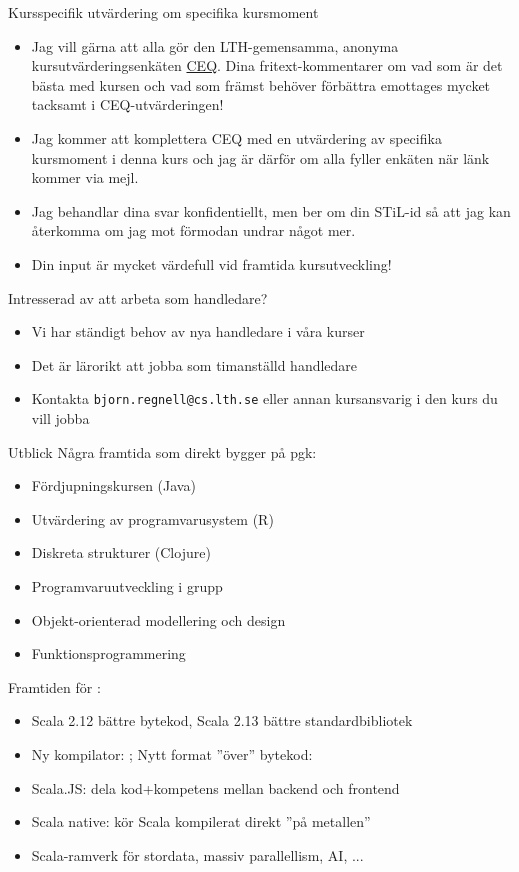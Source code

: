 \begin{Slide}{Kursspecifik utvärdering om specifika kursmoment}\SlideFontSmall
\begin{itemize}
\item Jag vill gärna att alla gör den LTH-gemensamma, anonyma kursutvärderingsenkäten \href{https://www.ceq.lth.se/}{CEQ}. Dina fritext-kommentarer om vad som är det bästa med kursen och vad som främst behöver förbättra emottages mycket tacksamt i CEQ-utvärderingen!
\item Jag kommer att komplettera CEQ med en  utvärdering av specifika kursmoment i denna kurs och jag är därför  om alla fyller enkäten när länk kommer via mejl.
\item Jag behandlar dina svar konfidentiellt, men ber om din STiL-id så att jag kan återkomma om jag mot förmodan undrar något mer.
\item Din input är mycket värdefull vid framtida kursutveckling!
\end{itemize}
\end{Slide}

\begin{Slide}{Intresserad av att arbeta som handledare?}
\begin{itemize}
\item Vi har ständigt behov av nya handledare i våra kurser
\item Det är lärorikt att jobba som timanställd handledare
\item Kontakta \verb|bjorn.regnell@cs.lth.se| eller annan kursansvarig i den kurs du vill jobba
\end{itemize}
\end{Slide}

\begin{Slide}{Utblick}\SlideFontSmall
Några framtida  som direkt bygger på pgk:
\begin{itemize}
\item Fördjupningskursen (Java)
\item Utvärdering av programvarusystem (R)
\item Diskreta strukturer (Clojure)
\item Programvaruutveckling i grupp
\item Objekt-orienterad modellering och design
\item Funktionsprogrammering
\end{itemize}
Framtiden för :
\begin{itemize}
\item Scala 2.12 bättre bytekod, Scala 2.13 bättre standardbibliotek
\item Ny kompilator: ; Nytt format ''över'' bytekod: 
\item Scala.JS: dela kod+kompetens mellan backend och frontend
\item Scala native: kör Scala kompilerat direkt ''på metallen''
\item Scala-ramverk för stordata, massiv parallellism, AI, ...
\end{itemize}
\end{Slide}

